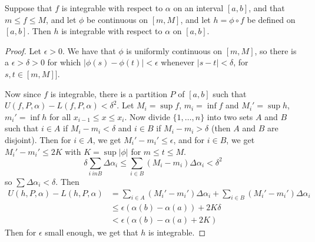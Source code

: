 \begin{theorem}\label{7.1.10}
    Suppose that $f$ is integrable with respect to  $\alpha$ on  an interval
    $[a,b]$, and that  $m \leq f \leq M$, and let  $\phi$ be continuous on
    $[m,M]$, and let  $h=\phi \circ f$ be defined on  $[a,b]$. Then  $h$ is
    integrable with respect to  $\alpha$ on  $[a,b]$.
\end{theorem}
\begin{proof}
    Let $\epsilon>0$. We have that  $\phi$ is uniformly continuous on $[m,M]$,
    so there is a $\epsilon>\delta>0$ for which $|\phi(s)-\phi(t)|<\epsilon$
    whenever  $|s-t|<\delta$, for  $s,t \in [m,M]]$.

    Now since $f$ is integrable, there is a partition  $P$ of  $[a,b]$ such that
    $U(f,P, \alpha)-L(f,P,\alpha)<\delta^2$. Let  $M_i=\sup{f}$, $m_i=\inf{f}$ and 
    $M_i'=\sup{h}$, $m_i'=\inf{h}$ for all  $x_{i-1} \leq x \leq x_i$. Now
    divide  $\{1, \dots, n\}$ into two sets  $A$ and  $B$ such that  $i \in A$
    if  $M_i-m_i<\delta$ and  $i \in B$ if  $M_i-m_i>\delta$  (then $A$ and  $B$
    are disjoint). Then for $i \in A$, we get  $M_i'-m_i' \leq \epsilon$, and
for  $i \in B$, we get  $M_i'-m_i' \leq 2K$ with  $K=\sup{|\phi|}$ for  $m \leq
t \leq M$.
    \begin{equation*}
        \delta\sum_{i\ in B}{\Delta{\alpha_i}} \leq \sum_{i \in B}{(M_i-m_i)\Delta{\alpha_i}}<\delta^2
    \end{equation*}
    so $\sum{\Delta{\alpha_i}}<\delta$. Then
        \begin{align*}
            U(h,P,\alpha)-L(h,P,\alpha) &= \sum_{i \in A}{(M_i'-m_i')\Delta{\alpha_i}}+\sum_{i \in B}{(M_i'-m_i')\Delta{\alpha_i}} \\ 
                              &\leq \epsilon(\alpha(b)-\alpha(a))+2K\delta \\
                              &<\epsilon(\alpha(b)-\alpha(a)+2K)
        \end{align*}
    Then for $\epsilon$ small enough, we get that  $h$ is integrable.
\end{proof}
